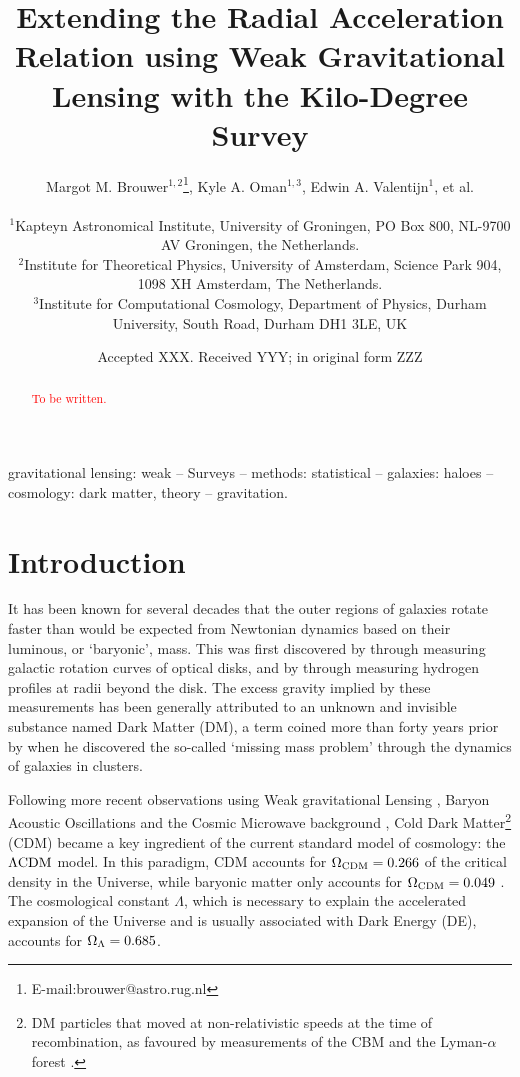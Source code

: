 \documentclass[usenatbib]{mnras}
\title[Extending the RAR with KiDS weak lensing]{Extending the Radial Acceleration Relation using Weak Gravitational Lensing with the Kilo-Degree Survey}
\author[M. M. Brouwer et al.]{Margot M. Brouwer$^{1,2}$\thanks{E-mail:brouwer@astro.rug.nl}, Kyle A. Oman$^{1,3}$, Edwin A. Valentijn$^{1}$, et al.
	\\
	\\
	$^{1}$Kapteyn Astronomical Institute, University of Groningen, PO Box 800, NL-9700 AV Groningen, the Netherlands.\\
	$^{2}$Institute for Theoretical Physics, University of Amsterdam, Science Park 904, 1098 XH Amsterdam, The Netherlands. \\
    $^{3}$Institute for Computational Cosmology, Department of Physics, Durham University, South Road, Durham DH1 3LE, UK \\
}
\date{Accepted XXX. Received YYY; in original form ZZZ}
\newcommand{\lcdm}{{\rm \Lambda CDM}}
\begin{document}
\label{firstpage}
\pagerange{\pageref{firstpage}--\pageref{lastpage}}
\maketitle

\begin{abstract}
\textcolor{red}{To be written.}
\end{abstract}


\begin{keywords}
gravitational lensing: weak -- Surveys -- methods: statistical -- galaxies: haloes -- cosmology: dark matter, theory -- gravitation.
\\
\end{keywords}

\clearpage




\section{Introduction}
\label{sec:introduction}

It has been known for several decades that the outer regions of galaxies rotate faster than would be expected from Newtonian dynamics based on their luminous, or `baryonic', mass. This was first discovered by \cite{rubin1983} through measuring galactic rotation curves of optical disks, and by \cite{bosma1981} through measuring hydrogen profiles at radii beyond the disk. The excess gravity implied by these measurements has been generally attributed to an unknown and invisible substance named Dark Matter (DM), a term coined more than forty years prior by \cite{zwicky1937} when he discovered the so-called `missing mass problem' through the dynamics of galaxies in clusters.

Following more recent observations using Weak gravitational Lensing \cite[WL,][]{hoekstra2004,linden2014,mandelbaum2015}, Baryon Acoustic Oscillations \cite[BAO's,][]{eisenstein2005,blake2011} and the Cosmic Microwave background \cite[CMB,][]{spergel2003,planck2014}, Cold Dark Matter\footnote{DM particles that moved at non-relativistic speeds at the time of recombination, as favoured by measurements of the CBM \cite[]{planck2014} and the Lyman-$\alpha$ forest \cite[]{viel2013}.} (CDM) became a key ingredient of the current standard model of cosmology: the $\lcdm$ model. In this paradigm, CDM accounts for $\Omega_{\rm CDM}=0.266$ of the critical density in the Universe, while baryonic matter only accounts for $\Omega_{\rm CDM}=0.049$ \cite[]{planck2018}. The cosmological constant $\Lambda$, which is necessary to explain the accelerated expansion of the Universe and is usually associated with Dark Energy (DE), accounts for $\Omega_{\rm \Lambda}=0.685$.
\end{document}
